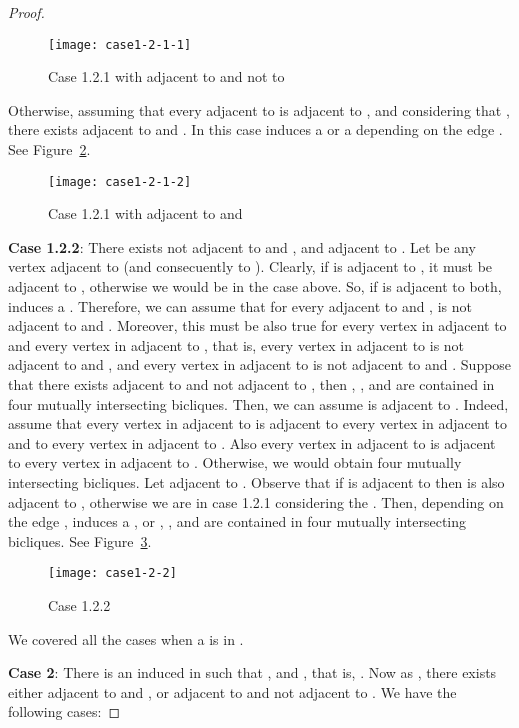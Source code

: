 \documentclass[12pt]{article}
\begin{document}
\begin{proof}
\FloatBarrier
\begin{figure}[h]
	\centering
	\texttt{[image: case1-2-1-1]}
	\caption{Case 1.2.1 with  adjacent to  and not to }
	\label{case1-2-1-1}
\end{figure}
\FloatBarrier

Otherwise, assuming that  every  adjacent  to  is adjacent
to ,  and considering that , there exists  
adjacent to   and .  In this case   induces a 
or a  depending on the edge .
See Figure~\ref{case1-2-1-2}.

\FloatBarrier
\begin{figure}[h]
	\centering
	\texttt{[image: case1-2-1-2]}
	\caption{Case 1.2.1 with  adjacent to  and }
	\label{case1-2-1-2}
\end{figure}
\FloatBarrier

\textbf{Case 1.2.2}: There exists  not adjacent to  and , and adjacent to .
Let  be any vertex adjacent to  (and consecuently to ). Clearly, if  is adjacent to , it must be adjacent to , otherwise we
would be in the case above. So, if  is adjacent to both,  induces a .
Therefore, we can assume that for every  adjacent to  and ,  is not adjacent to  and .
Moreover, this must be also true for every vertex in  adjacent to  and every vertex in  adjacent to , that is,
every vertex in  adjacent to  is not adjacent to  and , and every vertex in  adjacent to  is not 
adjacent to  and . Suppose that there exists  adjacent to  and not adjacent to , then ,
,  and  are contained in four mutually intersecting bicliques.
Then, we can assume  is adjacent to . Indeed, assume that every vertex in  adjacent to  is adjacent to 
every vertex in  adjacent to  and to every vertex in  adjacent to . Also 
every vertex in  adjacent to  is adjacent to every vertex in  adjacent to .
Otherwise, we would obtain four mutually intersecting bicliques. Let  adjacent to .
Observe that if  is adjacent to  then  is also adjacent to ,
otherwise we are in case  1.2.1 considering the . Then,
depending on the edge ,    induces  a ,  or
, ,  and  
are contained in four mutually intersecting bicliques. 
See Figure~\ref{case1-2-2}.

\FloatBarrier
\begin{figure}[h]
	\centering
	\texttt{[image: case1-2-2]}
	\caption{Case 1.2.2}
	\label{case1-2-2}
\end{figure}
\FloatBarrier
We covered all the cases when a  is in .

\textbf{Case 2}:  There is an induced  in  such
that ,  and , that is, .  Now  as ,  there exists  either 
adjacent to  and , or  adjacent to  and not adjacent
to . We have the following cases:


\end{proof}
\end{document}
